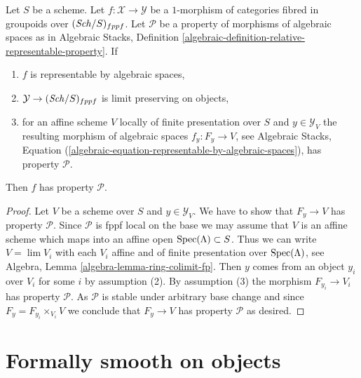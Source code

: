 \begin{lemma}
\label{lemma-check-property-limit-preserving}
Let $S$ be a scheme. Let $f : \mathcal{X} \to \mathcal{Y}$ be a $1$-morphism
of categories fibred in groupoids over $(\mathit{Sch}/S)_{fppf}$. Let $\mathcal{P}$
be a property of morphisms of algebraic spaces as in
Algebraic Stacks, Definition
\ref{algebraic-definition-relative-representable-property}. If
\begin{enumerate}
\item $f$ is representable by algebraic spaces,
\item $\mathcal{Y} \to (\mathit{Sch}/S)_{fppf}$ is limit preserving on objects,
\item for an affine scheme $V$ locally of finite presentation over $S$ and
$y \in \mathcal{Y}_V$ the resulting morphism of algebraic spaces
$f_y : F_y \to V$, see Algebraic Stacks, Equation
(\ref{algebraic-equation-representable-by-algebraic-spaces}),
has property $\mathcal{P}$.
\end{enumerate}
Then $f$ has property $\mathcal{P}$.
\end{lemma}

\begin{proof}
Let $V$ be a scheme over $S$ and $y \in \mathcal{Y}_V$. We have to show
that $F_y \to V$ has property $\mathcal{P}$. Since $\mathcal{P}$ is
fppf local on the base we may assume that $V$ is an affine scheme which
maps into an affine open $\mathop{\mathrm{Spec}}(\Lambda) \subset S$. Thus we can write
$V = \lim V_i$ with each $V_i$ affine and of finite presentation over
$\mathop{\mathrm{Spec}}(\Lambda)$, see Algebra, Lemma \ref{algebra-lemma-ring-colimit-fp}.
Then $y$ comes from an object $y_i$ over $V_i$ for some $i$ by assumption (2).
By assumption (3) the morphism $F_{y_i} \to V_i$ has property $\mathcal{P}$.
As $\mathcal{P}$ is stable under arbitrary base change and since
$F_y = F_{y_i} \times_{V_i} V$ we conclude that $F_y \to V$ has property
$\mathcal{P}$ as desired.
\end{proof}



\section{Formally smooth on objects}
\label{section-formally-smooth}

